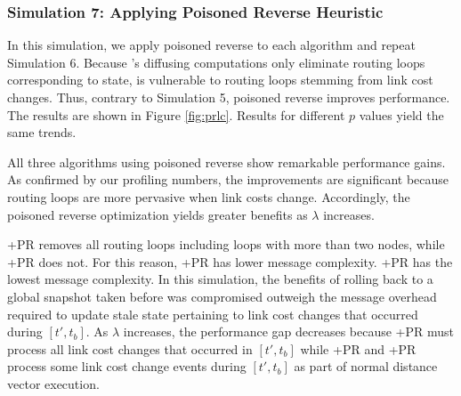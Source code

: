 \subsubsection{Simulation 7: Applying Poisoned Reverse Heuristic}
In this simulation, we apply poisoned reverse to each algorithm and repeat Simulation 6. Because \purges's diffusing computations only eliminate routing loops corresponding 
to \badvector state, \purge is vulnerable to routing loops stemming from link cost changes.  Thus, contrary to Simulation 5, poisoned reverse improves \purge performance.
The results are shown in Figure \ref{fig:prlc}. %
Results for different $p$ values yield the same trends. 

All three algorithms using poisoned reverse show remarkable performance gains.
As confirmed by our profiling numbers, the improvements are significant because routing loops are more pervasive when link costs change.  
Accordingly, the poisoned reverse optimization yields greater benefits as $\lambda$ increases. %

\purges+{\textsc PR} removes all routing loops including loops with more than two nodes, while \seconds+{\textsc PR} does not. 
For this reason, \purges+{\textsc PR} has lower message complexity.   %
\cprs+{\textsc PR} has the lowest message complexity. %
In this simulation, the benefits of rolling back to a global snapshot taken before \bad was compromised outweigh the message overhead required to update stale state pertaining to 
link cost changes that occurred during $[t',t_b]$. As $\lambda$ increases,
the performance gap decreases because \cprs+{\textsc PR} must process all link cost changes that occurred in $[t',t_b]$ while \seconds+{\textsc PR}  and \purges+{\textsc PR}
process some link cost change events during $[t',t_b]$ as part of normal distance vector execution.

